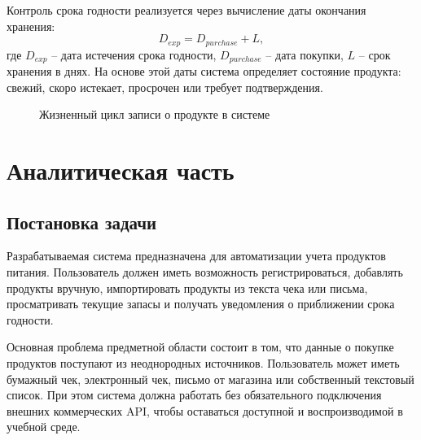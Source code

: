 \documentclass[14pt,a4paper]{extreport}
\renewcommand{\thechapter}{\arabic{chapter}}
\begin{document}
Контроль срока годности реализуется через вычисление даты окончания хранения:
\[
  D_{exp} = D_{purchase} + L,
\]
где \(D_{exp}\) -- дата истечения срока годности, \(D_{purchase}\) -- дата покупки, \(L\) -- срок хранения в днях. На основе этой даты система определяет состояние продукта: свежий, скоро истекает, просрочен или требует подтверждения.

\begin{figure}[H]
\centering
{}
\caption{Жизненный цикл записи о продукте в системе}
\end{figure}

\newpage
\chapter[Глава \thechapter Аналитическая часть]{Аналитическая часть}

\section{Постановка задачи}

Разрабатываемая система предназначена для автоматизации учета продуктов питания. Пользователь должен иметь возможность регистрироваться, добавлять продукты вручную, импортировать продукты из текста чека или письма, просматривать текущие запасы и получать уведомления о приближении срока годности.

Основная проблема предметной области состоит в том, что данные о покупке продуктов поступают из неоднородных источников. Пользователь может иметь бумажный чек, электронный чек, письмо от магазина или собственный текстовый список. При этом система должна работать без обязательного подключения внешних коммерческих API, чтобы оставаться доступной и воспроизводимой в учебной среде.
\end{document}
